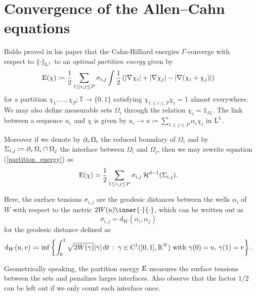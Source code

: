 \chapter{Convergence of the Allen--Cahn equations}

Baldo proved in his paper \cite{baldo_minimal_interface_criterion} that the Cahn-Hilliard energies $ \Gamma $-converge with respect to $ \norm{ \cdot }_{\operatorname{L}^{ 1 }} $ to an \emph{optimal partition energy} given by
\begin{equation}
	\label{partition_energy}
	\operatorname{E} ( \chi ) 
	\coloneqq
	\frac{ 1 }{ 2 }
	\sum_{ 1 \leq i, j \leq P }
	\sigma_{ i , j }
	\int
	\frac{ 1 }{ 2 }
	\left(
	\abs{ \nabla \chi_{ i } }
	+
	\abs{ \nabla \chi_{ j } }
	-
	\abs{ \nabla ( \chi_{ i } + \chi_{ j } ) }
	\right)
\end{equation}
for a partition $ \chi_{ 1 }, \dotsc, \chi_{ P } \colon \mathbb{ T } \to \{ 0, 1 \} $ satisfying $ \chi_{ 1 \leq i \leq P } \chi_{ i } = 1 $ almost everywhere. We may also define measurable sets $ \Omega_{ i } $ through the relation $ \chi_{ i } = \mathds{1}_{ \Omega_{ i } }  $. The link between a sequence $ u_{ \varepsilon} $ and $ \chi $ is given by $ u_{ \varepsilon} \to u \coloneqq \sum_{ 1 \leq j \leq P } \alpha_{ i } \chi_{ i } $ in $ \operatorname{L}^{ 1 } $. 

Moreover if we denote by $ \operatorname{\partial_{ \ast }} \Omega_{ i } $ the reduced boundary of $ \Omega_{ i } $ and by $ \Sigma_{ i , j } \coloneqq \operatorname{\partial_{ \ast }} \Omega_{ i } \cap \Omega_{ j } $ the interface between $ \Omega_{ i } $ and $ \Omega_{ j } $, then we may rewrite equation (\ref{partition_energy}) as 
\begin{equation*}
	\operatorname{E} ( \chi ) 
	=
	\frac{ 1 }{ 2 }
	\sum_{1 \leq i, j \leq P }
	\sigma_{ i , j } \operatorname{\mathcal{H}}^{ d - 1 } ( \Sigma_{ i , j } ).
\end{equation*}

Here, the surface tensions $ \sigma_{ i , j } $ are the geodesic distances between the wells $ \alpha_{ i } $ of $ W $ with respect to the metric $ 2W(u) \inner{\cdot}{\cdot} $, which can be written out as
\begin{equation*}
	\sigma_{ i , j } = \mathrm{ d }_{ W } ( \alpha_{ i } , \alpha_{ j } )
\end{equation*}
for the geodesic distance defined as
\begin{equation}
	\mathrm{ d }_{ W } ( u, v )
	\coloneqq
	\inf
	\left\{
	\int_{ 0 }^{ 1 }
	\sqrt{ 2 W ( \gamma ) }
	\abs{ \dot{ \gamma }  }
	\dd{t}
	\,
	\colon
	\, \gamma \in \mathrm{ C }^{ 1 }( [0, 1 ], \mathbb{ R }^{ N } ) \text{ with } \gamma( 0 ) = u,\, \gamma( 1 )= v 
	\right\}.
\end{equation}

Geometrically speaking, the partition energy $ \operatorname{E} $ measures the surface tensions between the sets and penalizes larges interfaces. Also observe that the factor $ 1/2 $ can be left out if we only count each interface once.